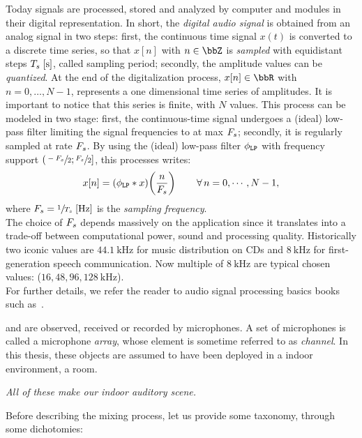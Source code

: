 Today signals are processed, stored and analyzed by computer and modules in their digital representation.
In short, the \textit{digital audio signal} is obtained from an analog signal in two steps:
first, the continuous time signal $x(t)$ is converted to a discrete time series,
so that $x[n]$ with $n \in \Z$ is \textit{sampled}  with equidistant steps $T_s\;[\si{\second}]$, called sampling period;
secondly, the amplitude values can be \textit{quantized}.
At the end of the digitalization process, $x[n] \in \R$ with $n = 0, \dots, N-1$, represents a one dimensional time series of amplitudes.
It is important to notice that this series is finite, with $N$ values.
This process can be modeled in two stage: first, the continuous-time signal undergoes a (ideal) low-pass filter
limiting the signal frequencies to at max $F_s$; secondly, it is regularly sampled at rate $F_s$.
By using the (ideal) low-pass filter $\phi_\mathtt{LP}$ with frequency support $\kintervoc{\sfrac{-\Fs}{2}}{\sfrac{\Fs}{2}}$,
this processes writes:
\begin{equation}
    x[n] = (\lowpassfilter \conv x)\kparen{\frac{n}{\Fs}}
    \mathspace
    \kforall[n = 0, \cdots, N-1]
\end{equation}
where $\Fs = \sfrac{1}{\Ts}\;[\si{\Hz}]$ is the \textit{sampling frequency}.
\\The choice of $F_s$ depends massively on the application since it translates into a trade-off between computational power, sound and processing quality.
Historically two iconic values are $\SI{44.1}{\kHz}$ for music distribution on CDs and $\SI{8}{\kHz}$ for first-generation speech communication.
Now multiple of $\SI{8}{\kHz}$ are typical chosen values: ($16, 48, 96, \SI{128}{\kHz}$).
\\For further details, we refer the reader to audio signal processing basics books such as~\cite{rocchesso2003introduction}.

 and are observed, received or recorded by microphones.
A set of microphones is called a microphone \textit{array}, whose element is sometime referred to as \textit{channel}.
In this thesis, these objects are assumed to have been deployed in a indoor environment, a room.
\begin{center}
    \textit{All of these make our indoor \emph{auditory scene}.}
\end{center}
Before describing the mixing process, let us provide some taxonomy, through some dichotomies:

